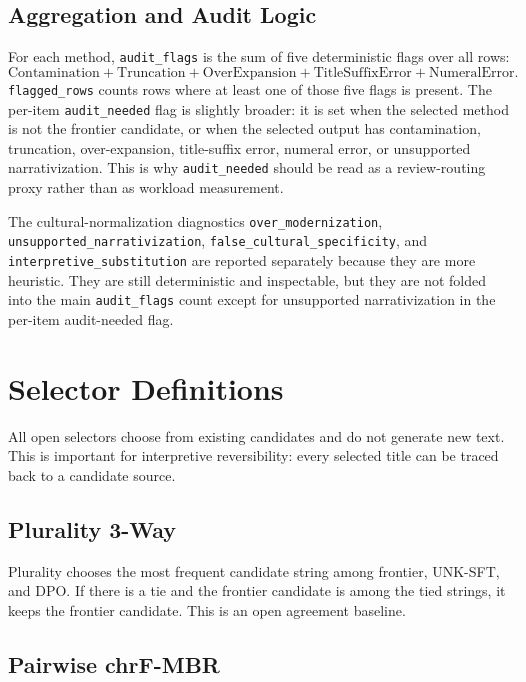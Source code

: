 \documentclass{article}
\newcommand{\code}[1]{\texttt{#1}}
\begin{document}
\subsection{Aggregation and Audit Logic}

For each method, \code{audit\_flags} is the sum of five deterministic flags over all rows:
\[
\mathrm{Contamination}+\mathrm{Truncation}+\mathrm{OverExpansion}+\mathrm{TitleSuffixError}+\mathrm{NumeralError}.
\]
\code{flagged\_rows} counts rows where at least one of those five flags is present. The per-item \code{audit\_needed} flag is slightly broader: it is set when the selected method is not the frontier candidate, or when the selected output has contamination, truncation, over-expansion, title-suffix error, numeral error, or unsupported narrativization. This is why \code{audit\_needed} should be read as a review-routing proxy rather than as workload measurement.

The cultural-normalization diagnostics \code{over\_modernization}, \code{unsupported\_narrativization}, \code{false\_cultural\_specificity}, and \code{interpretive\_substitution} are reported separately because they are more heuristic. They are still deterministic and inspectable, but they are not folded into the main \code{audit\_flags} count except for unsupported narrativization in the per-item audit-needed flag.

\section{Selector Definitions}

All open selectors choose from existing candidates and do not generate new text. This is important for interpretive reversibility: every selected title can be traced back to a candidate source.

\subsection{Plurality 3-Way}

Plurality chooses the most frequent candidate string among frontier, UNK-SFT, and DPO. If there is a tie and the frontier candidate is among the tied strings, it keeps the frontier candidate. This is an open agreement baseline.

\subsection{Pairwise chrF-MBR}
\end{document}
